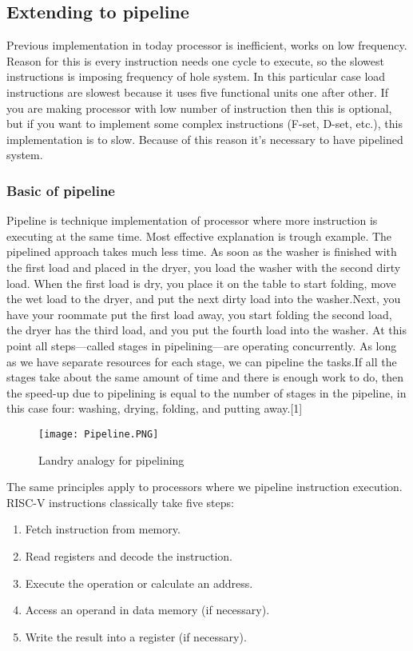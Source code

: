 \documentclass{scrreprt}
\begin{document}
\subsection*{Extending to pipeline}
Previous implementation in today processor is inefficient, works on low frequency. Reason for this is every instruction needs one cycle to execute, so the slowest instructions is imposing frequency of hole system. In this particular case load instructions are slowest because it uses five functional units one after other. If you are making processor with low number of instruction then this is optional, but if you want to implement some complex instructions (F-set, D-set, etc.), this implementation is to slow. 
Because of this reason it's necessary to have pipelined system. 
    \subsubsection{Basic of pipeline}
        Pipeline is technique implementation of processor where more instruction is executing at the same time. Most effective explanation is trough example. The pipelined approach takes much less time. As soon as the washer is finished with the first load and placed in the dryer, you load the washer with the second dirty load. When the first load is dry, you place it on the table to start folding, move the wet load to the dryer, and put the next dirty load into the washer.Next, you have your roommate put the first load away, you start folding the second load, the dryer has the third load, and you put the fourth load into the washer. At this point all steps—called stages in pipelining—are operating concurrently. As long as we have separate resources for each stage, we can pipeline the tasks.If all the stages take about the same amount of time and there is enough work to do, then the speed-up due to pipelining is equal to the number of stages in the pipeline, in this case four: washing, drying, folding, and putting away.[1]
        \begin{figure}[htb!]
            \centering
            \texttt{[image: Pipeline.PNG]}
            \caption{Landry analogy for pipelining}
            \label{fig:Landry analogy for pipelining}
        \end{figure}
        \hfill \break
        \hfill \break
        \hfill \break
        The same principles apply to processors where we pipeline instruction execution. RISC-V instructions classically take five steps:
        \begin{enumerate}
            \item Fetch instruction from memory.  
            \item Read registers and decode the instruction. 
            \item Execute the operation or calculate an address. 
            \item Access an operand in data memory (if necessary).
            \item Write the result into a register (if necessary). 
        \end{enumerate}
\end{document}
